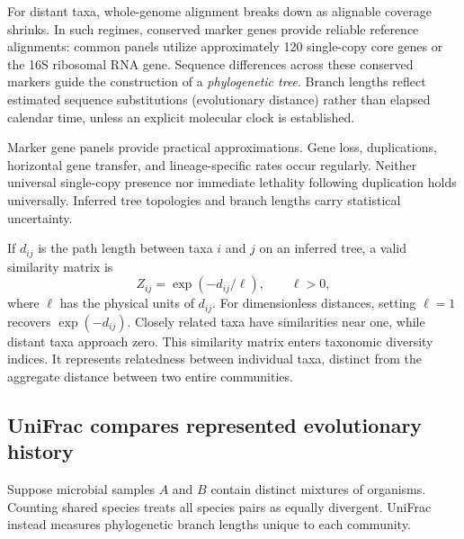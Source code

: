 For distant taxa, whole-genome alignment breaks down as alignable coverage shrinks. In such regimes, conserved marker genes provide reliable reference alignments: common panels utilize approximately 120 single-copy core genes or the 16S ribosomal RNA gene. Sequence differences across these conserved markers guide the construction of a \emph{phylogenetic tree}. Branch lengths reflect estimated sequence substitutions (evolutionary distance) rather than elapsed calendar time, unless an explicit molecular clock is established.

\begin{remark}
Marker gene panels provide practical approximations. Gene loss, duplications, horizontal gene transfer, and lineage-specific rates occur regularly. Neither universal single-copy presence nor immediate lethality following duplication holds universally. Inferred tree topologies and branch lengths carry statistical uncertainty.
\end{remark}

If $d_{ij}$ is the path length between taxa $i$ and $j$ on an inferred tree, a valid similarity matrix is
\begin{equation}
Z_{ij}=\exp(-d_{ij}/\ell),\qquad \ell>0,
\label{eq:l05-tree-similarity}
\end{equation}
where $\ell$ has the physical units of $d_{ij}$. For dimensionless distances, setting $\ell=1$ recovers $\exp(-d_{ij})$. Closely related taxa have similarities near one, while distant taxa approach zero. This similarity matrix enters taxonomic diversity indices. It represents relatedness between individual taxa, distinct from the aggregate distance between two entire communities.

\subsection{UniFrac compares represented evolutionary history}
\label{subsec:l05-unifrac}
Suppose microbial samples $A$ and $B$ contain distinct mixtures of organisms. Counting shared species treats all species pairs as equally divergent. UniFrac instead measures phylogenetic branch lengths unique to each community.

